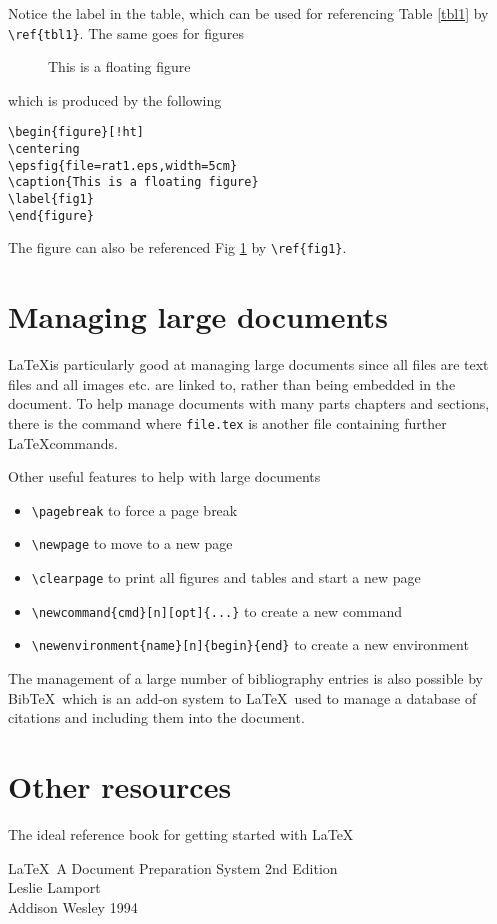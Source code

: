 \documentclass[12pt, a4paper]{book}
\begin{document}
Notice the label in the table, which can be used for referencing Table \ref{tbl1} by \verb+\ref{tbl1}+.  The same goes for figures
\begin{figure}[!ht]
\centering
{}
\caption{This is a floating figure}
\label{fig1}
\end{figure}
which is produced by the following
\begin{verbatim}
\begin{figure}[!ht]
\centering
\epsfig{file=rat1.eps,width=5cm}
\caption{This is a floating figure}
\label{fig1}
\end{figure}
\end{verbatim}

The figure can also be referenced Fig \ref{fig1} by \verb+\ref{fig1}+.



\section*{Managing large documents}
\LaTeX is particularly good at managing large documents since all files are text files and all images etc. are linked to, rather than being embedded in the document.  To help manage documents with many parts chapters and sections, there is the \verb++ command where \verb+file.tex+ is another file containing further \LaTeX commands.

Other useful features to help with large documents
\begin{itemize}
\item \verb+\pagebreak+ to force a page break
\item \verb+\newpage+ to move to a new page
\item \verb+\clearpage+ to print all figures and tables and start a new page
\item \verb+\newcommand{cmd}[n][opt]{...}+ to create a new command
\item \verb+\newenvironment{name}[n]{begin}{end}+ to create a new environment
\end{itemize}

The management of a large number of bibliography entries is also possible by Bib\TeX\ which is an add-on system to \LaTeX\ used to manage a database of citations and including them into the document.



\section*{Other resources}
The ideal reference book for getting started with \LaTeX\ \cite{bo:lamport}
\begin{center}
\begin{minipage}[t]{14.5cm}
\LaTeX\ A Document Preparation System 2nd Edition\\
Leslie Lamport\\
Addison Wesley 1994
\end{minipage}
\end{center}
\end{document}
